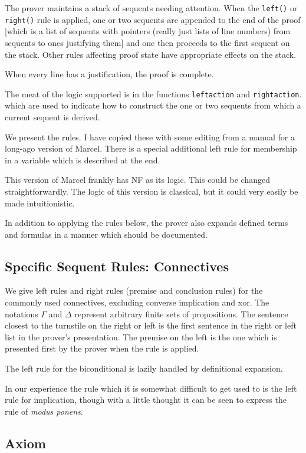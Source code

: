 \documentclass[12pt]{article}
\begin{document}
The prover maintains a stack of sequents needing attention.  When the {\tt left()} or {\tt right()} rule is applied, one or two sequents are appended to the end of the proof [which is a list of sequents with pointers (really just lists of line numbers) from sequents to ones justifying them] and one then proceeds to the first sequent on the stack.  Other rules affecting proof state have appropriate effects on the stack.

When every line has a justification, the proof is complete.

The meat of the logic supported is in the functions {\tt leftaction} and {\tt rightaction}. which are used to indicate how to construct the one or two sequents from which a current sequent is derived.

We present the rules.  I have copied these with some editing from a manual for a long-ago version of Marcel.  There is a special additional left rule
for membership in a variable which is described at the end.

This version of Marcel frankly has NF as its logic.  This could be changed straightforwardly.  The logic of this version is classical, but it could very easily be made intuitionistic.

In addition to applying the rules below, the prover also expands defined terms and formulas in a manner which should be documented.

\subsection{Specific Sequent Rules:  Connectives}

We give left rules and right rules (premise and conclusion rules) for the commonly used connectives,
excluding converse implication and xor.  The notations $\Gamma$ and
$\Delta$ represent arbitrary finite sets of propositions.  The
sentence closest to the turnstile on the right or left is the first
sentence in the right or left list in the prover's presentation.  The
premise on the left is the one which is presented first by the prover
when the rule is applied.

The left rule for the biconditional is lazily handled by definitional expansion.

In our experience the rule which it is somewhat difficult to get used
to is the left rule for implication, though with a little thought it
can be seen to express the rule of {\em modus ponens\/}.

\subsection{Axiom}
\end{document}
